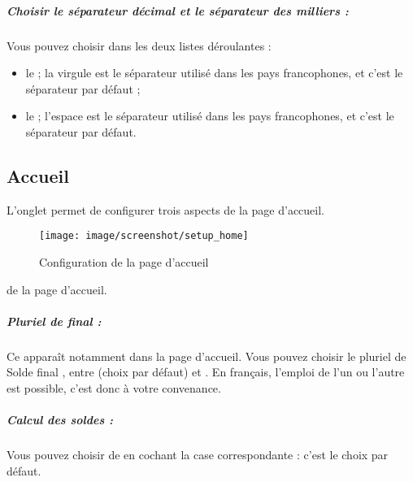 



\subparagraph{Choisir le séparateur décimal et le séparateur des milliers :}

Vous pouvez choisir dans les deux listes déroulantes :
\begin{itemize}
	\item le  ; la virgule est le séparateur utilisé dans les pays francophones, et c'est le séparateur par défaut ;    
	\item le  ; l'espace est le séparateur utilisé dans les pays francophones, et c'est le séparateur par défaut.
\end{itemize}


\subsection{Accueil\label{setup-general-home}}

L'onglet  permet de configurer trois aspects \ifIllustration de la page d'accueil.
\begin{figure}[ht]
\begin{center}
\texttt{[image: image/screenshot/setup\_home]}
\end{center}
\caption{Configuration de la page d'accueil}
\label{setup-home-img}
\end{figure}
\else de la page d'accueil.
\fi


\subparagraph{Pluriel de final :\label{setup-general-home-final}}

Ce  apparaît notamment dans la page d'accueil. Vous pouvez choisir le pluriel de \og Solde final \fg{}, entre  (choix par défaut) et . En français, l'emploi de l'un ou l'autre est possible, c'est donc à votre convenance. 


\subparagraph{Calcul des soldes :\label{setup-general-home-balance}}

Vous pouvez choisir de  en cochant la case correspondante : c'est le choix par défaut.



